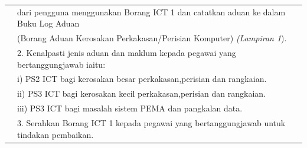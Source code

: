 \documentclass[
]{article}
\begin{document}
\begin{longtable}[]{@{}ll@{}}
\begin{minipage}[t]{0.23\columnwidth}
\strut
\end{minipage} & \begin{minipage}[t]{0.71\columnwidth}\raggedright
dari pengguna menggunakan Borang ICT 1 dan catatkan aduan ke dalam Buku
Log Aduan\strut
\end{minipage}\tabularnewline
\begin{minipage}[t]{0.23\columnwidth}\raggedright
\strut
\end{minipage} & \begin{minipage}[t]{0.71\columnwidth}\raggedright
(Borang Aduan Kerosakan Perkakasan/Perisian Komputer) \emph{(Lampiran
1}).\strut
\end{minipage}\tabularnewline
\begin{minipage}[t]{0.23\columnwidth}\raggedright
\strut
\end{minipage} & \begin{minipage}[t]{0.71\columnwidth}\raggedright
2. Kenalpasti jenis aduan dan maklum kepada pegawai yang
bertanggungjawab iaitu:\strut
\end{minipage}\tabularnewline
\begin{minipage}[t]{0.23\columnwidth}\raggedright
\strut
\end{minipage} & \begin{minipage}[t]{0.71\columnwidth}\raggedright
i) PS2 ICT bagi kerosakan besar perkakasan,perisian dan rangkaian.\strut
\end{minipage}\tabularnewline
\begin{minipage}[t]{0.23\columnwidth}\raggedright
\strut
\end{minipage} & \begin{minipage}[t]{0.71\columnwidth}\raggedright
ii) PS3 ICT bagi kerosakan kecil perkakasan,perisian dan
rangkaian.\strut
\end{minipage}\tabularnewline
\begin{minipage}[t]{0.23\columnwidth}\raggedright
\strut
\end{minipage} & \begin{minipage}[t]{0.71\columnwidth}\raggedright
iii) PS3 ICT bagi masalah sistem PEMA dan pangkalan data.\strut
\end{minipage}\tabularnewline
\begin{minipage}[t]{0.23\columnwidth}\raggedright
\strut
\end{minipage} & \begin{minipage}[t]{0.71\columnwidth}\raggedright
3. Serahkan Borang ICT 1 kepada pegawai yang bertanggungjawab untuk
tindakan pembaikan.\strut
\end{minipage}\tabularnewline

\end{longtable}
\end{document}
